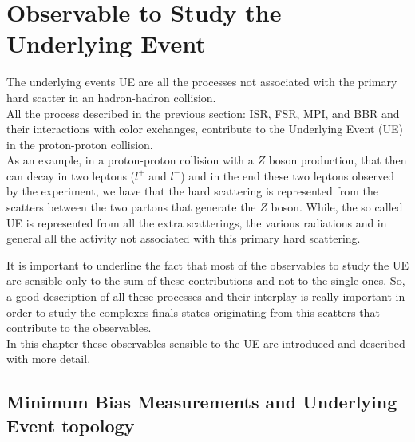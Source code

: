 
\chapter{Observable to Study the Underlying Event}
\label{chap:ObservabletoStudytheUnderlyingEvent}

The underlying events UE are all the processes not associated with the primary hard scatter in an hadron-hadron collision.
\\
All the process described in the previous section: ISR, FSR, MPI, and BBR and their interactions with color exchanges, contribute to the Underlying Event (UE) in the proton-proton collision.
\\
As an example, in a proton-proton collision with a $Z$ boson production, that then can decay in two leptons ($l^+$ and $l^-$) and in the end these two leptons observed by the experiment, we have that the hard scattering is represented from the scatters between the two partons that generate the $Z$ boson. While, the so called UE is represented from all the extra scatterings, the various radiations and in general all the activity not associated with this primary hard scattering.  

\medskip

It is important to underline the fact that most of the observables to study the UE are sensible only to the sum of these contributions and not to the single ones. So, a good description of all these processes and their interplay is really important in order to study the complexes finals states originating from this scatters that contribute to the observables.
\\
In this chapter these observables sensible to the UE are introduced and described with more detail.

\section{Minimum Bias Measurements and Underlying Event topology}

